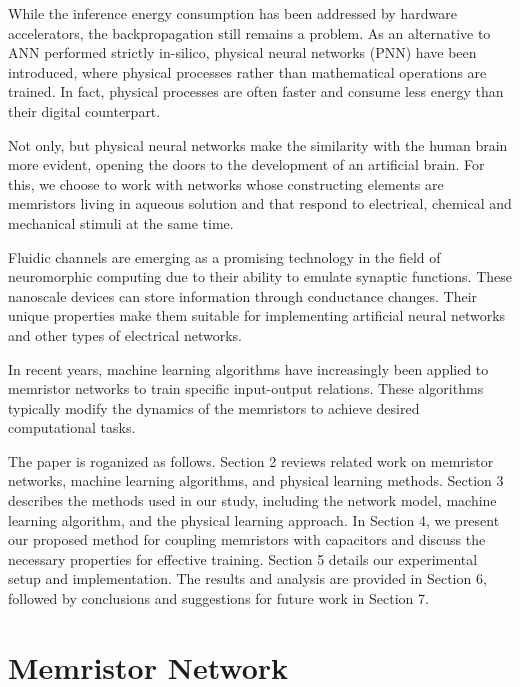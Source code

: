 \documentclass[reprint,superscriptaddress,prb,showkeys]{revtex4-2}
\begin{document}
While the inference energy consumption has been addressed by hardware accelerators, the backpropagation still remains a problem. As an alternative to ANN performed strictly in-silico, physical neural networks (PNN) have been introduced, where physical processes rather than mathematical operations are trained\cite{}. In fact, physical processes are often faster and consume less energy than their digital counterpart. 



Not only, but physical neural networks make the similarity with the human brain more evident, opening the doors to the development of an artificial brain. For this, we choose to work with networks whose constructing elements are memristors living in aqueous solution and that respond to electrical, chemical and mechanical stimuli at the same time.

Fluidic channels are emerging as a promising technology in the field of neuromorphic computing due to their ability to emulate synaptic functions. These nanoscale devices can store information through conductance changes. Their unique properties make them suitable for implementing artificial neural networks and other types of electrical networks.

In recent years, machine learning algorithms have increasingly been applied to memristor networks to train specific input-output relations. These algorithms typically modify the dynamics of the memristors to achieve desired computational tasks.



The paper is roganized as follows. Section 2 reviews related work on memristor networks, machine learning algorithms, and physical learning methods. Section 3 describes the methods used in our study, including the network model, machine learning algorithm, and the physical learning approach. In Section 4, we present our proposed method for coupling memristors with capacitors and discuss the necessary properties for effective training. Section 5 details our experimental setup and implementation. The results and analysis are provided in Section 6, followed by conclusions and suggestions for future work in Section 7.

\newpage

\section{\label{sec:memristor_network}Memristor Network}
\end{document}
